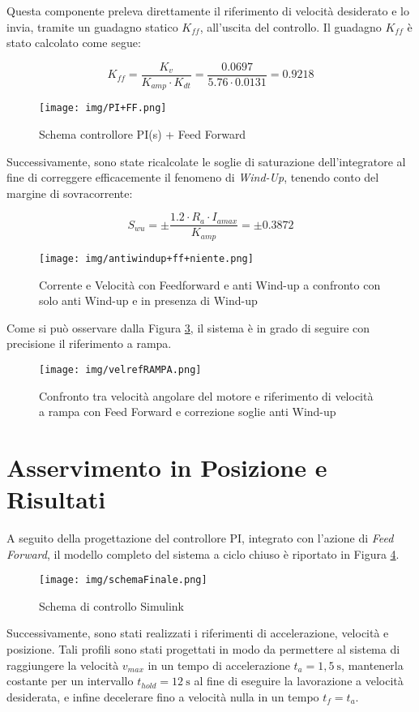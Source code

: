 \documentclass{article}
\begin{document}
Questa componente preleva direttamente il riferimento di velocità desiderato e lo invia, tramite un guadagno statico $K_{ff}$, all’uscita del controllo. Il guadagno $K_{ff}$ è stato calcolato come segue:

\[
K_{ff} = \frac{K_{v}}{K_{amp} \cdot K_{dt}} = \frac{0.0697}{5.76 \cdot 0.0131} = 0.9218
\]

\begin{figure}[h!]
\centering
\texttt{[image: img/PI+FF.png]}
\caption{Schema controllore PI(s) + Feed Forward}
\label{fig:pi}
\end{figure}

Successivamente, sono state ricalcolate le soglie di saturazione dell’integratore al fine di correggere efficacemente il fenomeno di \textit{Wind-Up}, tenendo conto del margine di sovracorrente:

\[
S_{wu} = \pm  \frac{1.2 \cdot R_a \cdot I_{amax}}{K_{amp}} = \pm 0.3872
\]
\begin{figure}[h!]
    \centering
    \texttt{[image: img/antiwindup+ff+niente.png]}
    \caption{Corrente e Velocità con Feedforward e anti Wind-up a confronto con solo anti Wind-up e in presenza di Wind-up}
    \label{fig:enter-label}
\end{figure}

Come si può osservare dalla Figura \ref{fig:rampa}, il sistema è in grado di seguire con precisione il riferimento a rampa.

\begin{figure}[h!]
\centering
\texttt{[image: img/velrefRAMPA.png]}
\caption{Confronto tra velocità angolare del motore e riferimento di velocità a rampa con Feed Forward e correzione soglie anti Wind-up}
\label{fig:rampa}
\end{figure}
\newpage
\section{Asservimento in Posizione e Risultati}
A seguito della progettazione del controllore PI, integrato con l’azione di \textit{Feed Forward}, il modello completo del sistema a ciclo chiuso è riportato in Figura \ref{fig:modelloFin}.

\vspace{0.2cm}
\begin{figure}[h!]
\centering
\texttt{[image: img/schemaFinale.png]}
\caption{Schema di controllo Simulink}
\label{fig:modelloFin}
\end{figure}
\vspace{05cm}
Successivamente, sono stati realizzati i riferimenti di accelerazione, velocità e posizione. Tali profili sono stati progettati in modo da permettere al sistema di raggiungere la velocità $v_{max}$ in un tempo di accelerazione $t_a = 1{,}5~\text{s}$, mantenerla costante per un intervallo $t_{hold} = 12~\text{s}$ al fine di eseguire la lavorazione a velocità desiderata, e infine decelerare fino a velocità nulla in un tempo $t_f = t_a$.
\end{document}
